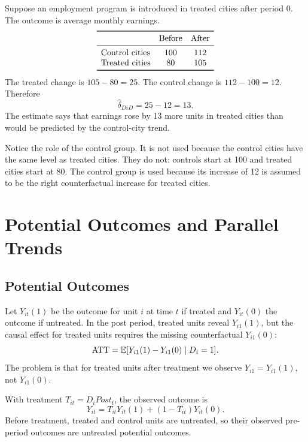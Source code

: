\begin{exmp}
Suppose an employment program is introduced in treated cities after period 0.
The outcome is average monthly earnings.
\[
\begin{array}{lcc}
\toprule
& \text{Before} & \text{After}\\
\midrule
\text{Control cities} & 100 & 112\\
\text{Treated cities} & 80 & 105\\
\bottomrule
\end{array}
\]
The treated change is $105-80=25$. The control change is $112-100=12$.
Therefore
\[
    \widehat{\delta}_{DiD}=25-12=13.
\]
The estimate says that earnings rose by 13 more units in treated cities than
would be predicted by the control-city trend.
\end{exmp}

Notice the role of the control group. It is not used because the control cities
have the same level as treated cities. They do not: controls start at 100 and
treated cities start at 80. The control group is used because its increase of 12
is assumed to be the right counterfactual increase for treated cities.

\section{Potential Outcomes and Parallel Trends}

\subsection{Potential Outcomes}

Let $Y_{it}(1)$ be the outcome for unit $i$ at time $t$ if treated and
$Y_{it}(0)$ the outcome if untreated. In the post period, treated units reveal
$Y_{i1}(1)$, but the causal effect for treated units requires the missing
counterfactual $Y_{i1}(0)$:
\[
    \mathrm{ATT}
    =
    \mathbb{E}[Y_{i1}(1)-Y_{i1}(0)\mid D_i=1].
\]
The problem is that for treated units after treatment we observe
$Y_{i1}=Y_{i1}(1)$, not $Y_{i1}(0)$.

\begin{defN}
With treatment $T_{it}=D_i Post_t$, the observed outcome is
\[
    Y_{it}=T_{it}Y_{it}(1)+(1-T_{it})Y_{it}(0).
\]
Before treatment, treated and control units are untreated, so their observed
pre-period outcomes are untreated potential outcomes.
\end{defN}

